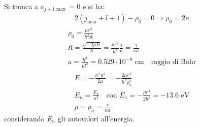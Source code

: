 Si tronca a $a_{j+1\max}=0$ e si ha:
\begin{equation}\begin{split}
2\left(j_{\max}+l+1\right)-\rho_0=0
\Longrightarrow \rho_0=2n
\end{split}\end{equation}
\begin{equation}\begin{split}
\rho_0=\frac{\mu e^2}{\hbar ^2\mathfrak{K}} \\
\mathfrak{K}=\frac{\sqrt{-2\mu E}}{\hbar }=\frac{\mu e^2}{\hbar ^2}\frac{1}{n}=\frac{1}{an} \\
a=\frac{\hbar ^2}{\mu l^2}=0.529\cdot 10^{-8} \textrm{ cm} \quad \textrm{raggio di Bohr}
\end{split}\end{equation}
\begin{equation}\begin{split}
E=-\frac{\hbar ^2\mathfrak{K}^2}{2\mu}=-\frac{2\mu e^4}{\hbar ^2\rho_0^2} \\
E_n=\frac{E_1}{n^2} \quad \textrm{con } E_1=-\frac{\mu e^4}{2\hbar ^2}=-13.6 \textrm{ eV} \\
\rho=\rho_n=\frac{r}{na}
\end{split}\end{equation}
considerando $E_n$ gli autovalori all'energia.